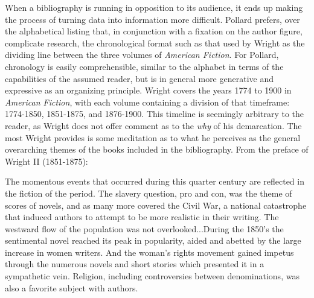 When a bibliography is running in opposition to its audience, it ends up making the process of turning data into information more difficult. Pollard prefers, over the alphabetical listing that, in conjunction with a fixation on the author figure, complicate research, the chronological format such as that used by Wright as the dividing line between the three volumes of \textit{American Fiction}. For Pollard, chronology is easily comprehensible, similar to the alphabet in terms of the capabilities of the assumed reader, but is in general more generative and expressive as an organizing principle. Wright covers the years 1774 to 1900 in \textit{American Fiction}, with each volume containing a division of that timeframe: 1774-1850, 1851-1875, and 1876-1900. This timeline is seemingly arbitrary to the reader, as Wright does not offer comment as to the \textit{why} of his demarcation. The most Wright provides is some meditation as to what he perceives as the general overarching themes of the books included in the bibliography. From the preface of Wright II (1851-1875):
\begin{displayquote}
The momentous events that occurred during this quarter century are reflected in the fiction of the period. The slavery question, pro and con, was the theme of scores of novels, and as many more covered the Civil War, a national catastrophe that induced authors to attempt to be more realistic in their writing. The westward flow of the population was not overlooked...During the 1850's the sentimental novel reached its peak in popularity, aided and abetted by the large increase in women writers. And the woman's rights movement gained impetus through the numerous novels and short stories which presented it in a sympathetic vein. Religion, including controversies between denominations, was also a favorite subject with authors.\autocite[vii]{wright_american_1957}
\end{displayquote}
